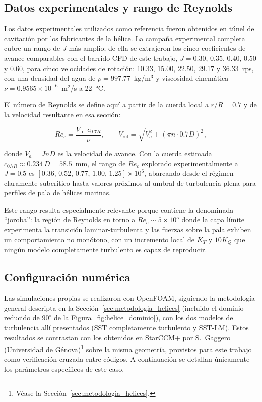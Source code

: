 \subsection{Datos experimentales y rango de Reynolds}
\label{sec:coreana_efd}

Los datos experimentales utilizados como referencia fueron obtenidos en túnel de
cavitación por los fabricantes de la hélice. La campaña experimental completa cubre un
rango de $J$ más amplio; de ella se extrajeron los cinco coeficientes de avance
comparables con el barrido CFD de este trabajo, $J = 0.30$, $0.35$, $0.40$, $0.50$ y
$0.60$, para cinco velocidades de rotación: 10.33,
15.00, 22.50, 29.17 y 36.33~rps, con una densidad del agua de
$\rho = 997.77$~kg/m$^3$ y viscosidad cinemática
$\nu = 0.9565 \times 10^{-6}$~m$^2$/s a 22~°C.

El número de Reynolds se define aquí a partir de la cuerda local a $r/R = 0.7$ y de
la velocidad resultante en esa sección:

\begin{equation}
    Re_c = \frac{V_\text{ref} \, c_{0.7R}}{\nu},
    \qquad
    V_\text{ref} = \sqrt{V_a^2 + (\pi n \cdot 0.7D)^2},
    \label{eq:Re_c}
\end{equation}

donde $V_a = J n D$ es la velocidad de avance. Con la cuerda estimada
$c_{0.7R} \approx 0.234\,D = 58.5$~mm, el rango de $Re_c$ explorado
experimentalmente a $J = 0.5$ es
$[0.36,\,0.52,\,0.77,\,1.00,\,1.25] \times 10^6$, abarcando desde el régimen
claramente subcrítico hasta valores próximos al umbral de turbulencia plena para
perfiles de pala de hélices marinas.

Este rango resulta especialmente relevante porque contiene la denominada
``joroba'': la región de Reynolds en torno a
$Re_c \sim 5 \times 10^5$ donde la capa límite experimenta la transición
laminar-turbulenta y las fuerzas sobre la pala exhiben un comportamiento
no monótono, con un incremento local de $K_T$ y $10K_Q$ que ningún modelo
completamente turbulento es capaz de reproducir.

\subsection{Configuración numérica}
\label{sec:coreana_cfd}

Las simulaciones propias se realizaron con OpenFOAM, siguiendo la
metodología general descripta en la Sección~\ref{sec:metodologia_helices} (incluido el
dominio reducido de $90^\circ$ de la Figura~\ref{fig:helice_dominio}), con los
dos modelos de turbulencia allí presentados (SST completamente turbulento y SST-LM).
Estos resultados se contrastan con los obtenidos en StarCCM+ por S.~Gaggero (Universidad de Génova)\footnote{Véase la Sección~\ref{sec:metodologia_helices}.} sobre la
misma geometría, provistos para este trabajo como verificación cruzada entre códigos.
A continuación se detallan únicamente los parámetros específicos de este caso.

